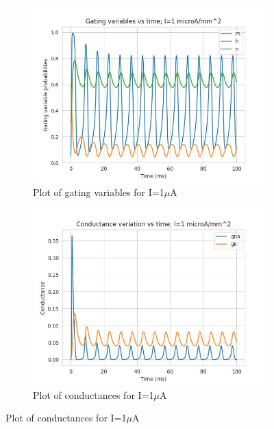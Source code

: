 \documentclass{article}
\begin{document}
\begin{figure}[h]
    \begin{subfigure}[b]{0.45\textwidth}
        \includegraphics[width=1.5\textwidth]{14.jpg}
        \caption{Plot of gating variables for I=1$\mu$A}
        \label{fig:IO2}
    \end{subfigure}
    \begin{subfigure}[b]{0.45\textwidth}
        \includegraphics[width=1.5\textwidth]{15.jpg}
        \caption{Plot of conductances for I=1$\mu$A}
        \label{fig:IO2}
    \end{subfigure}
\end{figure}
\end{document}
